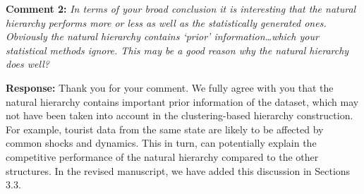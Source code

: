 \documentclass{article}
\numberwithin{equation}{section}
\theoremstyle{plain}
\theoremstyle{definition}
\theoremstyle{remark}
\begin{document}
\textbf{Comment 2:} \textit{In terms of your broad conclusion it is interesting that the natural hierarchy performs more or less as well as the statistically generated ones. Obviously the natural hierarchy contains `prior' information\ldots which your statistical methods ignore. This may be a good reason why the natural hierarchy does well?}

\medskip

\noindent \textbf{Response:} Thank you for your comment. We fully agree with you that the natural hierarchy contains important prior information of the dataset, which may not have been taken into account in the clustering-based hierarchy construction. For example, tourist data from the same state are likely to be affected by common shocks and dynamics. This in turn, can potentially explain the competitive performance of the natural hierarchy compared to the other structures. In the revised manuscript, we have added this discussion in Sections 3.3. 


\clearpage
\newpage


\end{document}
